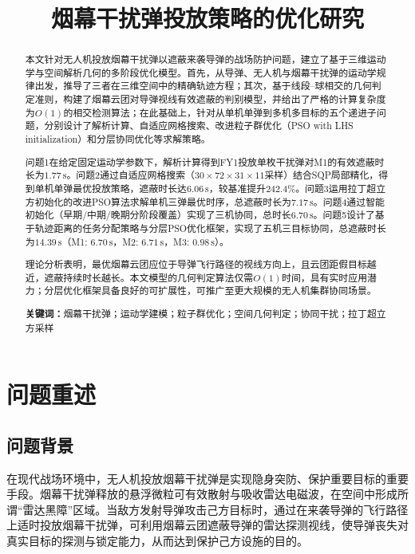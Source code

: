 \documentclass[12pt,a4paper]{ctexart}
\begin{document}
\title{\textbf{\huge 烟幕干扰弹投放策略的优化研究}}
\author{}
\date{}
\maketitle

\begin{abstract}
\noindent
本文针对无人机投放烟幕干扰弹以遮蔽来袭导弹的战场防护问题，建立了基于三维运动学与空间解析几何的多阶段优化模型。首先，从导弹、无人机与烟幕干扰弹的运动学规律出发，推导了三者在三维空间中的精确轨迹方程；其次，基于线段--球相交的几何判定准则，构建了烟幕云团对导弹视线有效遮蔽的判别模型，并给出了严格的计算复杂度为$O(1)$的相交检测算法；在此基础上，针对从单机单弹到多机多目标的五个递进子问题，分别设计了解析计算、自适应网格搜索、改进粒子群优化（PSO with LHS initialization）和分层协同优化等求解策略。

问题1在给定固定运动学参数下，解析计算得到FY1投放单枚干扰弹对M1的有效遮蔽时长为$1.77\,\text{s}$。问题2通过自适应网格搜索（$30 \times 72 \times 31 \times 11$采样）结合SQP局部精化，得到单机单弹最优投放策略，遮蔽时长达$6.06\,\text{s}$，较基准提升$242.4\%$。问题3运用拉丁超立方初始化的改进PSO算法求解单机三弹最优时序，总遮蔽时长为$7.17\,\text{s}$。问题4通过智能初始化（早期/中期/晚期分阶段覆盖）实现了三机协同，总时长$6.70\,\text{s}$。问题5设计了基于轨迹距离的任务分配策略与分层PSO优化框架，实现了五机三目标协同，总遮蔽时长为$14.39\,\text{s}$（M1: $6.70\,\text{s}$，M2: $6.71\,\text{s}$，M3: $0.98\,\text{s}$）。

理论分析表明，最优烟幕云团应位于导弹飞行路径的视线方向上，且云团距假目标越近，遮蔽持续时长越长。本文模型的几何判定算法仅需$O(1)$时间，具有实时应用潜力；分层优化框架具备良好的可扩展性，可推广至更大规模的无人机集群协同场景。

\vspace{1em}
\noindent\textbf{关键词：}烟幕干扰弹；运动学建模；粒子群优化；空间几何判定；协同干扰；拉丁超立方采样
\end{abstract}

\section{问题重述}

\subsection{问题背景}

在现代战场环境中，无人机投放烟幕干扰弹是实现隐身突防、保护重要目标的重要手段。烟幕干扰弹释放的悬浮微粒可有效散射与吸收雷达电磁波，在空间中形成所谓“雷达黑障”区域。当敌方发射导弹攻击己方目标时，通过在来袭导弹的飞行路径上适时投放烟幕干扰弹，可利用烟幕云团遮蔽导弹的雷达探测视线，使导弹丧失对真实目标的探测与锁定能力，从而达到保护己方设施的目的。
\end{document}
